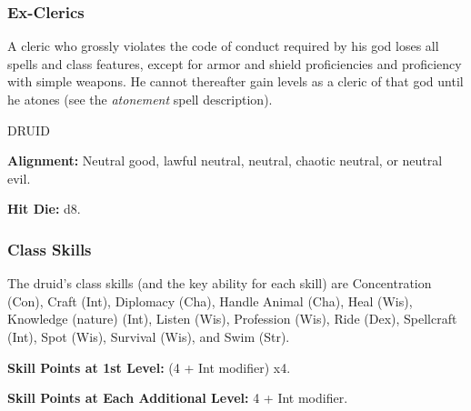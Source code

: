\documentclass{article}
\begin{document}
\vspace{12pt}
\subsubsection*{\textbf{Ex-Clerics}}

A cleric who grossly violates the code of conduct required by his god loses all 
spells and class features, except for armor and shield proficiencies and proficiency 
with simple weapons. He cannot thereafter gain levels as a cleric of that god until 
he atones (see the \textit{atonement }spell description).

\vspace{12pt}
{\LARGE{}DRUID}

\textbf{Alignment:} Neutral good, lawful neutral, neutral, chaotic neutral, or 
neutral evil.

\textbf{Hit Die:} d8.

\vspace{12pt}
\subsubsection*{\textbf{Class Skills}}

The druid's class skills (and the key ability for each skill) are Concentration 
(Con), Craft (Int), Diplomacy (Cha), Handle Animal (Cha), Heal (Wis), Knowledge 
(nature) (Int), Listen (Wis), Profession (Wis), Ride (Dex), Spellcraft (Int), Spot 
(Wis), Survival (Wis), and Swim (Str). 

\textbf{Skill Points at 1st Level:} (4 + Int modifier) x$ $4.

\textbf{Skill Points at Each Additional Level: }4 + Int modifier.

\vspace{12pt}
\end{document}
